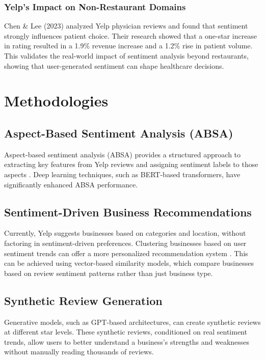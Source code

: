 \documentclass{article}
\begin{document}
\subsubsection{Yelp’s Impact on Non-Restaurant Domains}
Chen \& Lee (2023) \cite{ChenLee2024} analyzed Yelp physician reviews and found that sentiment strongly influences patient choice. Their research showed that a one-star increase in rating resulted in a 1.9\% revenue increase and a 1.2\% rise in patient volume. This validates the real-world impact of sentiment analysis beyond restaurants, showing that user-generated sentiment can shape healthcare decisions.

\section{Methodologies}

\subsection{Aspect-Based Sentiment Analysis (ABSA)}
Aspect-based sentiment analysis (ABSA) provides a structured approach to extracting key features from Yelp reviews and assigning sentiment labels to those aspects \cite{HuLiu2004}. Deep learning techniques, such as BERT-based transformers, have significantly enhanced ABSA performance.

\subsection{Sentiment-Driven Business Recommendations}
Currently, Yelp suggests businesses based on categories and location, without factoring in sentiment-driven preferences. Clustering businesses based on user sentiment trends can offer a more personalized recommendation system \cite{KellerKostromitina2020}. This can be achieved using vector-based similarity models, which compare businesses based on review sentiment patterns rather than just business type.

\subsection{Synthetic Review Generation}
Generative models, such as GPT-based architectures, can create synthetic reviews at different star levels. These synthetic reviews, conditioned on real sentiment trends, allow users to better understand a business’s strengths and weaknesses without manually reading thousands of reviews.
\end{document}
